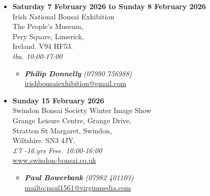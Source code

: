\begin{itemize}
    \item \textbf{Saturday 7 February 2026 to Sunday 8 February 2026}
    \\
    Irish National Bonsai Exhibition \\
    The People's Museum, \\
    Pery Square, Limerick, \\
    Ireland. V94 HF53.
    \\
    \emph{tba. 10:00-17:00}
    \begin{itemize}
        \item \textbf{\emph{Philip Donnelly}} \emph{(07990 756988)} \\
        \href{mailto:irishbonsaiexhibition@gmail.com}{irishbonsaiexhibition@gmail.com}
    \end{itemize}

    \item \textbf{Sunday 15 February 2026}
    \\
    Swindon Bonsai Society Winter Image Show \\
    Grange Leisure Centre, Grange Drive, \\
    Stratton St Margaret, Swindon, \\
    Wiltshire. SN3 4JY.
    \\
    \emph{£7 -16.yrs Free. 10:00-16:00}
    \\
    \href{http://www.swindon-bonsai.co.uk/}{www.swindon-bonsai.co.uk}
    \begin{itemize}
        \item \textbf{\emph{Paul Bowerbank}} \emph{(07982 401103)} \\
        \href{mailto:mailto:paul1561@virginmedia.com}{mailto:paul1561@virginmedia.com}
    \end{itemize}

\end{itemize}
\closearticle
